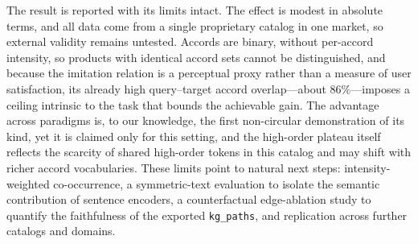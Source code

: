 \documentclass[conference]{IEEEtran}
\begin{document}
The result is reported with its limits intact. The effect is modest in absolute terms, and all
data come from a single proprietary catalog in one market, so external validity remains
untested. Accords are binary, without per-accord intensity, so products with identical accord
sets cannot be distinguished, and because the imitation relation is a perceptual proxy rather
than a measure of user satisfaction, its already high query--target accord overlap---about
$86\%$---imposes a ceiling intrinsic to the task that bounds the achievable gain. The advantage
across paradigms is, to our knowledge, the first non-circular demonstration of its kind, yet it
is claimed only for this setting, and the high-order plateau itself reflects the scarcity of
shared high-order tokens in this catalog and may shift with richer accord vocabularies. These
limits point to natural next steps: intensity-weighted co-occurrence, a symmetric-text
evaluation to isolate the semantic contribution of sentence encoders, a counterfactual
edge-ablation study to quantify the faithfulness of the exported \texttt{kg\_paths}, and
replication across further catalogs and domains.



\end{document}
